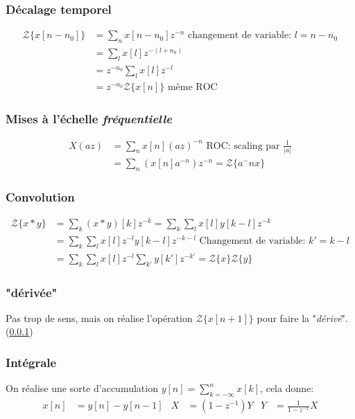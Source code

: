 \documentclass{report}
\begin{document}
\subsubsection{Décalage temporel} \label{Ztemp}
\begin{align*}
\mathcal{Z}\{x[n -n_0]\} &= \sum_n x[n-n_0]z^{-n} \text{ changement de variable: } l = n - n_0\\
&= \sum_l x[l]z^{-(l+n_0)}\\
&= z^{-n_0} \sum_l x[l]z^{-l}\\
&= z^{-n_0} \mathcal{Z}\{x[n]\} \text{ même ROC}
\end{align*}

\subsubsection{Mises à l'échelle \textit{fréquentielle}}
\begin{align*}
X(az) &= \sum_n x[n](az)^{-n} \text{  ROC: scaling par } \frac{1}{|a|}\\
&= \sum_n (x[n] a^{-n}) z^{-n} = \mathcal{Z}\{a{^-n}x\}
\end{align*}

\subsubsection{Convolution}
\begin{align*}
\mathcal{Z}\{x \ast y \} &= \sum_k ( x \ast y)[k] z^{-k} = \sum_k \sum_l x[l] y[k-l]z^{-k}\\
&= \sum_k \sum_l x[l]z^{-l} y[k-l]z^{-k-l} \text{ Changement de variable: } k' = k-l\\
&= \sum_k \sum_l x[l]z^{-l} \sum_{k'} y[k']z^{-k'} = \mathcal{Z}\{x\} \mathcal{Z}\{y\}
\end{align*}

\subsubsection{"dérivée"}
Pas trop de sens, mais on réalise l'opération $\mathcal{Z}\{x[n+1]\}$ pour faire la "\textit{dérivé}". (\ref{Ztemp})

\subsubsection{Intégrale}
On réalise une sorte d'accumulation $y[n] = \sum_{k=-\infty}^n x[k]$, cela donne:
\begin{align*}
x[n] &= y[n] - y[n-1] & X &= (1- z^{-1})Y & Y &= \frac{1}{1 -z^{-1}} X 
\end{align*}
\end{document}
